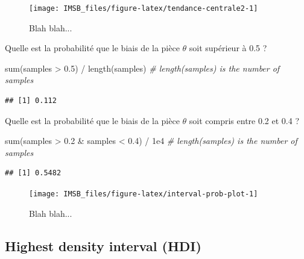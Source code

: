 \documentclass[
  a4paper,11pt,twoside,onecolumn,openright,final,oldfontcommands]{memoir}
\newenvironment{Shaded}{\begin{snugshade}}{\end{snugshade}}
\newcommand{\CommentTok}[1]{\textcolor[rgb]{0.56,0.35,0.01}{\textit{#1}}}
\newcommand{\FloatTok}[1]{\textcolor[rgb]{0.00,0.00,0.81}{#1}}
\newcommand{\FunctionTok}[1]{\textcolor[rgb]{0.00,0.00,0.00}{#1}}
\newcommand{\NormalTok}[1]{#1}
\newcommand{\SpecialCharTok}[1]{\textcolor[rgb]{0.00,0.00,0.00}{#1}}
\theoremstyle{definition}
\theoremstyle{definition}
\theoremstyle{definition}
\theoremstyle{definition}
\theoremstyle{remark}
\begin{document}
\begin{figure}[!htb]

{\centering \texttt{[image: IMSB\_files/figure-latex/tendance-centrale2-1]} 

}

\caption{Blah blah...}\label{fig:tendance-centrale2}
\end{figure}

Quelle est la probabilité que le biais de la pièce \(\theta\) soit supérieur à 0.5 ?

\begin{Shaded}
\begin{Highlighting}[]
\FunctionTok{sum}\NormalTok{(samples }\SpecialCharTok{\textgreater{}} \FloatTok{0.5}\NormalTok{) }\SpecialCharTok{/} \FunctionTok{length}\NormalTok{(samples) }\CommentTok{\# length(samples) is the number of samples}
\end{Highlighting}
\end{Shaded}

\begin{verbatim}
## [1] 0.112
\end{verbatim}

Quelle est la probabilité que le biais de la pièce \(\theta\) soit compris entre 0.2 et 0.4 ?

\begin{Shaded}
\begin{Highlighting}[]
\FunctionTok{sum}\NormalTok{(samples }\SpecialCharTok{\textgreater{}} \FloatTok{0.2} \SpecialCharTok{\&}\NormalTok{ samples }\SpecialCharTok{\textless{}} \FloatTok{0.4}\NormalTok{) }\SpecialCharTok{/} \FloatTok{1e4} \CommentTok{\# length(samples) is the number of samples}
\end{Highlighting}
\end{Shaded}

\begin{verbatim}
## [1] 0.5482
\end{verbatim}

\begin{figure}[!htb]

{\centering \texttt{[image: IMSB\_files/figure-latex/interval-prob-plot-1]} 

}

\caption{Blah blah...}\label{fig:interval-prob-plot}
\end{figure}

\hypertarget{highest-density-interval-hdi}{%
\subsection{Highest density interval (HDI)}\label{highest-density-interval-hdi}}
\end{document}
